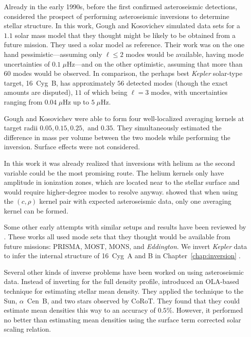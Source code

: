 Already in the early 1990s, before the first confirmed asteroseismic detections, \citet{1993ASPC...40..541G} considered the prospect of performing asteroseismic inversions to determine stellar structure. 
In this work, Gough and Kosovichev simulated data sets for a $1.1$ solar mass model that they thought might be likely to be obtained from a future mission. %
They used a solar model as reference. 
Their work was on the one hand pessimistic---assuming only ${\ell\leq 2}$ modes would be available, having mode uncertainties of ${0.1\;\mu\text{Hz}}$---and on the other optimistic, assuming that more than $60$ modes would be observed. 
In comparison, the perhaps best \emph{Kepler} solar-type target, 16~Cyg~B, has approximately $56$ detected modes (though the exact amounts are disputed), $11$ of which being ${\ell=3}$ modes, with uncertainties ranging from ${0.04\;\mu\text{Hz}}$ up to ${5\;\mu\text{Hz}}$. 

Gough and Kosovichev were able to form four well-localized averaging kernels at target radii $0.05, 0.15, 0.25,$ and $0.35$. 
They simultaneously estimated the difference in mass per volume between the two models while performing the inversion. 
Surface effects were not considered. 

In this work it was already realized that inversions with helium as the second variable could be the most promising route. 
The helium kernels only have amplitude in ionization zones, which are located near to the stellar surface and would require higher-degree modes to resolve anyway. 
\citet{2001ESASP.464..407B} showed that when using the ${(c,\rho)}$ kernel pair with expected asteroseismic data, only one averaging kernel can be formed. 

Some other early attempts with similar setups and results have been reviewed by \citet{2003Ap&SS.284..153B}. 
These works all used mode sets that they thought would be available from future missions: PRISMA, MOST, MONS, and \emph{Eddington}. %
We invert \emph{Kepler} data to infer the internal structure of 16~Cyg~A and B in Chapter~\ref{chap:inversion} \citep{2017ApJ...851...80B}. 


Several other kinds of inverse problems have been worked on using asteroseismic data. 
Instead of inverting for the full density profile, \citet{2012A&A...539A..63R} introduced an OLA-based technique for estimating stellar mean density. 
They applied the technique to the Sun, $\alpha$~Cen~B, and two stars observed by CoRoT. 
They found that they could estimate mean densities this way to an accuracy of $0.5\%$. 
However, it performed no better than estimating mean densities using the \citet{2008ApJ...683L.175K} surface term corrected solar scaling relation. 

